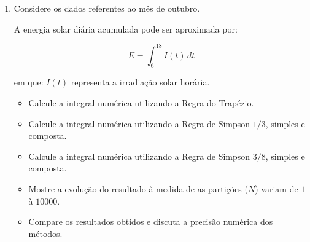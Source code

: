 \begin{enumerate}[label=\thesection.\arabic*]
\begin{itemize}

\item Calcule o polinômio de interpolação \(p(t)\) utilizando o método de Lagrange.

\item Calcule o polinômio de interpolação \(p(t)\) utilizando o método de Newton.

\item Calcule o modelo aproximado utilizando regressão linear.

\item Calcule modelos de regressão polinomial de graus $2$ e $10$.

\item Calcule os modelos de \(p(t)\) utilizando \textit{splines}: linear, quadrática e cúbica.

\item Analise os erros e defina qual o melhor polinômio, justificando sua resposta.

\item Compare erro numérico e custo computacional dos métodos para estimar a irradiação solar no instante:

\[
t = 10.5\mathrm{h}
\]

\end{itemize}


\item Considere os dados referentes ao mês de outubro.

A energia solar diária acumulada pode ser aproximada por:

\[
E = \int_{6}^{18} I(t)\,dt
\]

em que: \(I(t)\) representa a irradiação solar horária.
    \begin{itemize}
        \item Calcule a integral numérica utilizando a Regra do Trapézio.
        \item Calcule a integral numérica utilizando a Regra de Simpson \(1/3\), simples e composta.
        \item Calcule a integral numérica utilizando a Regra de Simpson \(3/8\), simples e composta.
        \item Mostre a evolução do resultado à medida de as partições ($N$) variam de $1$ à $10000$.
        \item Compare os resultados obtidos e discuta a precisão numérica dos métodos.
    \end{itemize}


\end{enumerate}
